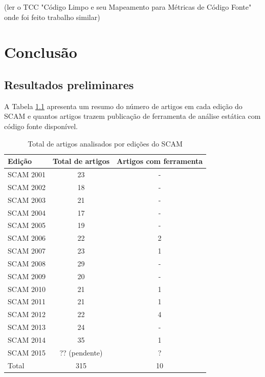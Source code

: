 \documentclass[qual, classic, a4paper]{ufbathesis}
\begin{document}
(ler o TCC "Código Limpo e seu Mapeamento para Métricas de Código Fonte" onde
foi feito trabalho similar)

\chapter{Conclusão}

\section{Resultados preliminares}\label{resultados}

A Tabela \ref{artigos-do-scam} apresenta um resumo do número de artigos em
cada edição do SCAM e quantos artigos trazem publicação de ferramenta de análise
estática com código fonte disponível.

\begin{table}
\caption{Total de artigos analisados por edições do SCAM}
\centering
\begin{tabular}{| l | c | c |}
\hline
Edição    & Total de artigos & Artigos com ferramenta \\
\hline
SCAM 2001 & 23               & -                      \\
SCAM 2002 & 18               & -                      \\
SCAM 2003 & 21               & -                      \\
SCAM 2004 & 17               & -                      \\
SCAM 2005 & 19               & -                      \\
SCAM 2006 & 22               & 2                      \\
SCAM 2007 & 23               & 1                      \\
SCAM 2008 & 29               & -                      \\
SCAM 2009 & 20               & -                      \\
SCAM 2010 & 21               & 1                      \\
SCAM 2011 & 21               & 1                      \\
SCAM 2012 & 22               & 4                      \\
SCAM 2013 & 24               & -                      \\
SCAM 2014 & 35               & 1                      \\
SCAM 2015 & ?? (pendente)    & ?                      \\
\hline
Total     & 315              & 10                     \\
\hline
\end{tabular}
\label{artigos-do-scam}
\end{table}
\end{document}
